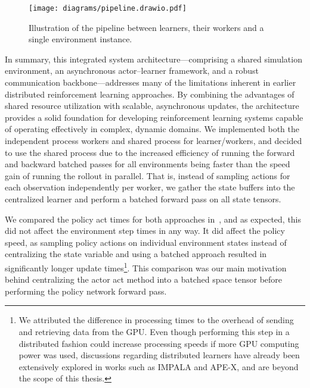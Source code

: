     \begin{figure}
        \centering
        \texttt{[image: diagrams/pipeline.drawio.pdf]}
        \caption{Illustration of the pipeline between learners, their workers and a single environment instance.}
        \label{fig:pipeline}
    \end{figure}

    In summary, this integrated system architecture—comprising a shared simulation environment, an asynchronous actor–learner framework, and
    a robust communication backbone—addresses many of the limitations inherent in earlier distributed reinforcement learning approaches.
    By combining the advantages of shared resource utilization with scalable, asynchronous updates, the architecture provides a solid foundation for
    developing reinforcement learning systems capable of operating effectively in complex, dynamic domains.
    We implemented both the independent process workers and shared process for learner/workers,
    and decided to use the shared process due to the increased efficiency of running the forward and backward batched passes
    for all environments being faster than the speed gain of running the rollout in parallel.
    That is, instead of sampling actions for each observation independently per worker,
    we gather the state buffers into the centralized learner and perform a batched forward pass on all state tensors.

    We compared the policy act times for both approaches in~,
    and as expected, this did not affect the environment step times in any way.
    It did affect the policy speed, as sampling policy actions on individual environment states instead of
    centralizing the state variable and using a batched approach resulted in significantly longer update times\footnote{
        We attributed the difference in processing times to the overhead of sending and retrieving data from the GPU.
        Even though performing this step in a distributed fashion could increase processing speeds if more GPU computing power was used,
        discussions regarding distributed learners have already been extensively explored in works such as IMPALA and APE-X,
        and are beyond the scope of this thesis.
    }.
    This comparison was our main motivation behind centralizing the actor act method into a batched space tensor
    before performing the policy network forward pass.


